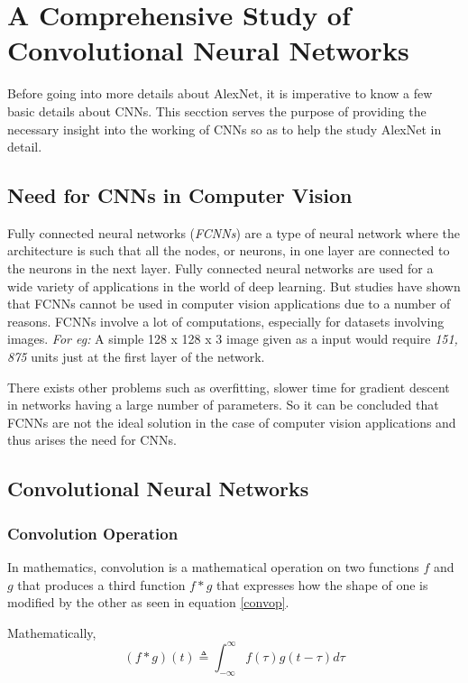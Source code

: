 \documentclass[11pt]{report}
\begin{document}
\chapter{A Comprehensive Study of Convolutional Neural Networks}
Before going into more details about AlexNet, it is imperative to know a few basic details about CNNs. This secction serves the purpose of providing the necessary insight into the working of CNNs so as to help the study AlexNet in detail.

\section{Need for CNNs in Computer Vision}
Fully connected neural networks (\textit{FCNNs}) are a type of neural network where the
architecture is such that all the nodes, or neurons, in one layer are connected to the neurons in the next layer. Fully connected neural networks are used for a wide variety of applications in the world of deep learning. But studies have shown that FCNNs cannot be used in computer vision applications due to a number of reasons. FCNNs involve a lot of computations, especially for datasets involving images. \textit{For eg:} A simple 128 x 128 x 3 image given as a input would require \textit{151, 875} units just at the first layer of the network.

There exists other problems such as overfitting, slower time for gradient descent in networks having a large number of parameters. So it can be concluded that FCNNs are not the ideal solution in the case of computer vision applications and thus arises the need for CNNs.

\section{Convolutional Neural Networks}
\subsection{Convolution Operation}
In mathematics, convolution is a mathematical operation on two functions $f$ and $g$ that
produces a third function $f \ast g$ that expresses how the shape of one is modified by the other as seen in equation \ref{convop}. 

Mathematically,
\begin{equation} \label{convop}
(f \ast g)(t) \triangleq \int_{-\infty}^{\infty} f(\tau)g(t-\tau)d\tau
\end{equation}
\end{document}
